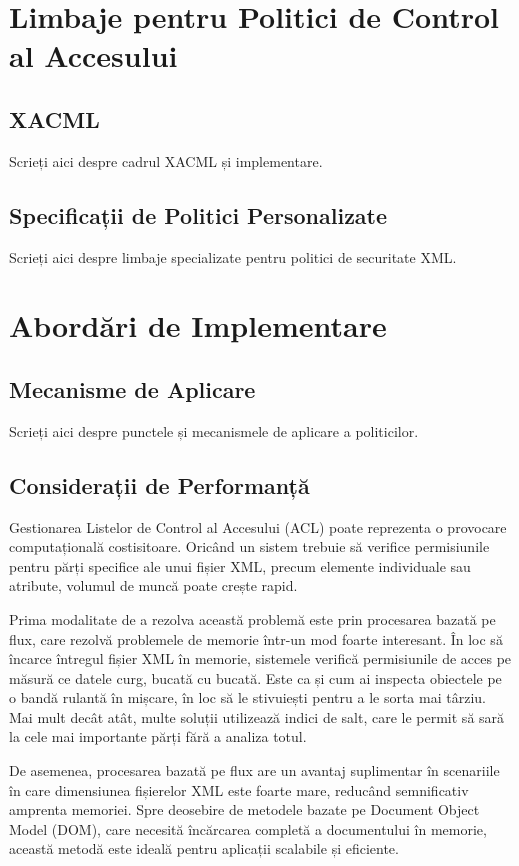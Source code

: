 \documentclass[runningheads]{llncs}
\begin{document}
\begin{spacing}{1.5}
\section{Limbaje pentru Politici de Control al Accesului}

\subsection{XACML}
Scrieți aici despre cadrul XACML și implementare.

\subsection{Specificații de Politici Personalizate}
Scrieți aici despre limbaje specializate pentru politici de securitate XML.

\section{Abordări de Implementare}

\subsection{Mecanisme de Aplicare}
Scrieți aici despre punctele și mecanismele de aplicare a politicilor.

\subsection{Considerații de Performanță}
Gestionarea Listelor de Control al Accesului (ACL) poate reprezenta o provocare computațională costisitoare. Oricând un sistem trebuie să verifice permisiunile pentru părți specifice ale unui fișier XML, precum elemente individuale sau atribute, volumul de muncă poate crește rapid.

Prima modalitate de a rezolva această problemă este prin procesarea bazată pe flux, care rezolvă problemele de memorie într-un mod foarte interesant. În loc să încarce întregul fișier XML în memorie, sistemele verifică permisiunile de acces pe măsură ce datele curg, bucată cu bucată. Este ca și cum ai inspecta obiectele pe o bandă rulantă în mișcare, în loc să le stivuiești pentru a le sorta mai târziu. Mai mult decât atât, multe soluții utilizează indici de salt, care le permit să sară la cele mai importante părți fără a analiza totul.

De asemenea, procesarea bazată pe flux are un avantaj suplimentar în scenariile în care dimensiunea fișierelor XML este foarte mare, reducând semnificativ amprenta memoriei. Spre deosebire de metodele bazate pe Document Object Model (DOM), care necesită încărcarea completă a documentului în memorie, această metodă este ideală pentru aplicații scalabile și eficiente.


\end{spacing}
\end{document}
